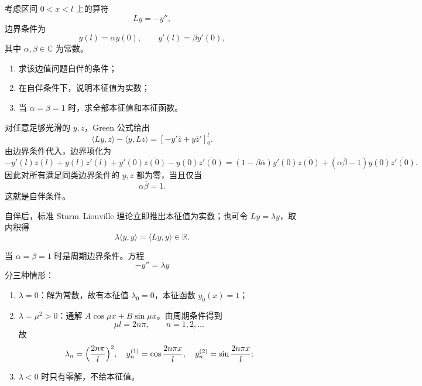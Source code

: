 \begin{question}
考虑区间 $0<x<l$ 上的算符
\[
Ly=-y'',
\]
边界条件为
\[
y(l)=\alpha y(0),\qquad y'(l)=\beta y'(0),
\]
其中 $\alpha,\beta\in\mathbb C$ 为常数。
\begin{enumerate}[label=（\arabic*）,leftmargin=2.8em,itemsep=0.2em]
\item 求该边值问题自伴的条件；
\item 在自伴条件下，说明本征值为实数；
\item 当 $\alpha=\beta=1$ 时，求全部本征值和本征函数。
\end{enumerate}
\begin{solution}

对任意足够光滑的 $y,z$，Green 公式给出
\[
\langle Ly,z\rangle-\langle y,Lz\rangle=[-y'\bar z+y\bar z']_0^l.
\]
由边界条件代入，边界项化为
\[
-y'(l)\overline{z(l)}+y(l)\overline{z'(l)}+y'(0)\overline{z(0)}-y(0)\overline{z'(0)}
=(1-\beta\overline\alpha)y'(0)\overline{z(0)}+(\alpha\overline\beta-1)y(0)\overline{z'(0)}.
\]
因此对所有满足同类边界条件的 $y,z$ 都为零，当且仅当
\[
\alpha\overline\beta=1.
\]
这就是自伴条件。

自伴后，标准 Sturm--Liouville 理论立即推出本征值为实数；也可令 $Ly=\lambda y$，取内积得
\[
\lambda\langle y,y\rangle=\langle Ly,y\rangle\in\mathbb R.
\]

当 $\alpha=\beta=1$ 时是周期边界条件。方程
\[
-y''=\lambda y
\]
分三种情形：
\begin{enumerate}[label=（\arabic*）,leftmargin=2.8em,itemsep=0.2em]
\item $\lambda=0$：解为常数，故有本征值 $\lambda_0=0$，本征函数 $y_0(x)=1$；
\item $\lambda=\mu^2>0$：通解 $A\cos\mu x+B\sin\mu x$。由周期条件得到
\[
\mu l=2n\pi,\qquad n=1,2,\dots
\]
故
\[
\lambda_n=\Bigl(\frac{2n\pi}{l}\Bigr)^2,
\quad y_n^{(1)}=\cos\frac{2n\pi x}{l},
\quad y_n^{(2)}=\sin\frac{2n\pi x}{l};
\]
\item $\lambda<0$ 时只有零解，不给本征值。
\end{enumerate}

\end{solution}
\end{question}

